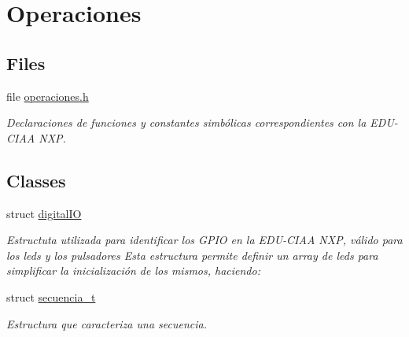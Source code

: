\hypertarget{group__operaciones}{}\section{Operaciones}
\label{group__operaciones}
\subsection*{Files}
\begin{DoxyCompactItemize}
\item 
file \hyperlink{operaciones_8h}{operaciones.\+h}
\begin{DoxyCompactList}\small\item\em Declaraciones de funciones y constantes simbólicas correspondientes con la E\+D\+U-\/\+C\+I\+AA N\+XP. \end{DoxyCompactList}\end{DoxyCompactItemize}
\subsection*{Classes}
\begin{DoxyCompactItemize}
\item 
struct \hyperlink{structdigital_i_o}{digital\+IO}
\begin{DoxyCompactList}\small\item\em Estructuta utilizada para identificar los G\+P\+IO en la E\+D\+U-\/\+C\+I\+AA N\+XP, válido para los leds y los pulsadores Esta estructura permite definir un array de leds para simplificar la inicialización de los mismos, haciendo\+: \end{DoxyCompactList}\item 
struct \hyperlink{structsecuencia__t}{secuencia\+\_\+t}
\begin{DoxyCompactList}\small\item\em Estructura que caracteriza una secuencia. \end{DoxyCompactList}\end{DoxyCompactItemize}
